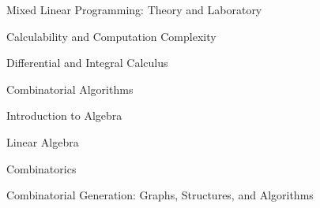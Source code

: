 \begin{cvtalks}
\begin{cvtalks}
  \cvtalk
  {Mixed Linear Programming: Theory and Laboratory}
  {}
  {
    \begin{cvitems}
      \item {} \hfill {} 
    \end{cvitems}
  }
  \cvtalk
  {Calculability and Computation Complexity}
  {}
  {
    \begin{cvitems}
      \item {} \hfill {} 
    \end{cvitems}
  }  
  \cvtalk
  {Differential and Integral Calculus}
  {}
  {
    \begin{cvitems}
      \item {} \hfill {} 
    \end{cvitems}
  }
  \cvtalk
  {Combinatorial Algorithms}
  {}
  {
    \begin{cvitems}
      \item {} \hfill {} 
    \end{cvitems}
  }
  \cvtalk
  {Introduction to Algebra}
  {}
  {
    \begin{cvitems}
      \item {} \hfill {} 
    \end{cvitems}
  }
  \cvtalk
  {Linear Algebra}
  {}
  {
    \begin{cvitems}
      \item {} \hfill {} 
    \end{cvitems}
  }  
  \cvtalk
  {Combinatorics}
  {}
  {
    \begin{cvitems}
      \item {} \hfill {} 
    \end{cvitems}
  }

  
  
\end{cvtalks}

\vspace{1 mm}


\begin{cvtalks}
  \cvtalk
  {Combinatorial Generation: Graphs, Structures, and Algorithms}
  {}
  {
    \begin{cvitems}
      \item {} \hfill {} 
    \end{cvitems}
  }
\end{cvtalks}



\end{cvtalks}
